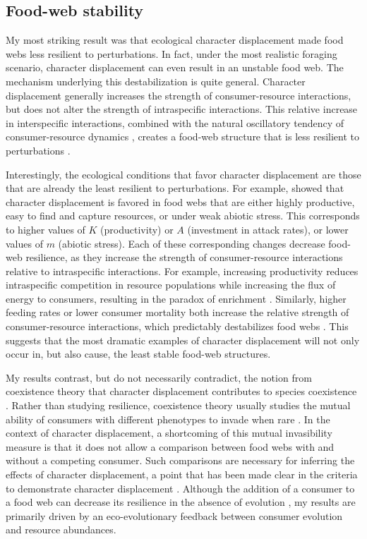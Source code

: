 \documentclass[11pt,]{article}
\begin{document}
\subsection{Food-web stability}\label{food-web-stability}

My most striking result was that ecological character displacement made
food webs less resilient to perturbations. In fact, under the most
realistic foraging scenario, character displacement can even result in
an unstable food web. The mechanism underlying this destabilization is
quite general. Character displacement generally increases the strength
of consumer-resource interactions, but does not alter the strength of
intraspecific interactions. This relative increase in interspecific
interactions, combined with the natural oscillatory tendency of
consumer-resource dynamics \citep{Lotka1925, Volterra1926}, creates a
food-web structure that is less resilient to perturbations
\citep{Chesson2008, Rip2011, McCann2011}.

Interestingly, the ecological conditions that favor character
displacement are those that are already the least resilient to
perturbations. For example, \citet{McPeek2019} showed that character
displacement is favored in food webs that are either highly productive,
easy to find and capture resources, or under weak abiotic stress. This
corresponds to higher values of \(K\) (productivity) or \(A\)
(investment in attack rates), or lower values of \(m\) (abiotic stress).
Each of these corresponding changes decrease food-web resilience, as
they increase the strength of consumer-resource interactions relative to
intraspecific interactions. For example, increasing productivity reduces
intraspecific competition in resource populations while increasing the
flux of energy to consumers, resulting in the paradox of enrichment
\citep{Rosenzweig1971}. Similarly, higher feeding rates or lower
consumer mortality both increase the relative strength of
consumer-resource interactions, which predictably destabilizes food webs
\citep{Rip2011, McCann2011}. This suggests that the most dramatic
examples of character displacement will not only occur in, but also
cause, the least stable food-web structures.

My results contrast, but do not necessarily contradict, the notion from
coexistence theory that character displacement contributes to species
coexistence \citep{Lawlor1976}. Rather than studying resilience,
coexistence theory usually studies the mutual ability of consumers with
different phenotypes to invade when rare \citep[i.e., mutual
invasibility;][]{Chesson2000}. In the context of character displacement,
a shortcoming of this mutual invasibility measure is that it does not
allow a comparison between food webs with and without a competing
consumer. Such comparisons are necessary for inferring the effects of
character displacement, a point that has been made clear in the criteria
to demonstrate character displacement
\citep{Schluter1992, Schluter2000}. Although the addition of a consumer
to a food web can decrease its resilience in the absence of evolution
\citep{May1973}, my results are primarily driven by an eco-evolutionary
feedback between consumer evolution and resource abundances.
\end{document}
